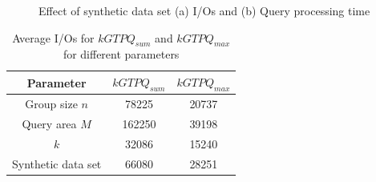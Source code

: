 \begin{figure}[htbp]
\begin{center}
\begin{tabular}{cc}
        \end{tabular}
    \caption{Effect of synthetic data set (a) I/Os and (b) Query processing time}
    \label{graph:max_u}
  \end{center}
   \vspace{-6mm}
\end{figure}
\vspace*{10pt}



\begin{table}[htbp]
  \centering
\begin{tabular}{|c|c|c|}
  \hline
  Parameter& $kGTPQ_{sum}$ & $kGTPQ_{max}$\\
  \hline
  Group size $n$ & 78225 & 20737 \\
  \hline
  Query area $M$& 162250 & 39198\\
  \hline
  $k$ & 32086 & 15240\\
  \hline
  Synthetic data set & 66080 & 28251 \\
  \hline
\end{tabular}
\caption{Average I/Os for $kGTPQ_{sum}$ and $kGTPQ_{max}$ for different parameters} \label{table:IO_Overhead} \vspace{-2mm}
\end{table}
\vspace*{10pt}


